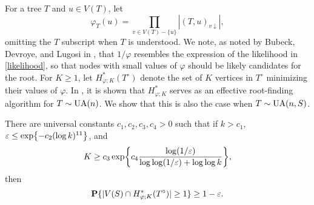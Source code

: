 For a tree $T$ and $u \in V(T)$, let
\[
  \varphi_T(u) = \prod_{v \in V(T) - \{u\}} |(T, u)_{v \downarrow}| ,
\]
omitting the $T$ subscript when $T$ is understood. We note, as noted
by Bubeck, Devroye, and Lugosi in \cite{finding-adam}, that
$1/\varphi$ resembles the expression of the likelihood in
\eqref{likelihood}, so that nodes with small values of $\varphi$
should be likely candidates for the root. For $K \ge 1$, let
$H^*_{\varphi; K}(T^\circ)$ denote the set of $K$ vertices in
$T^\circ$ minimizing their values of $\varphi$. In
\cite{finding-adam}, it is shown that $H^*_{\varphi; K}$ serves as an
effective root-finding algorithm for $T \sim \operatorname{UA}(n)$. We show that
this is also the case when $T \sim \operatorname{UA}(n, S)$.

\begin{prop}
  There are universal constants $c_1, c_2, c_3, c_4 > 0$ such that if
  $k > c_1$,
  $\eps \le \exp\left\{- c_2 (\log k)^{11} \right\}$, and
  \[
    K \ge c_3 \exp \left\{ c_4 \frac{\log (1/\eps)}{\log \log (1/\eps) + \log \log k } \right\} ,
  \]
  then
  \[
    \operatorname{\mathbf{P}}\{ |V(S) \cap H^*_{\varphi; K}(T^\circ)| \ge 1\} \ge 1 - \varepsilon .
  \]
\end{prop}
